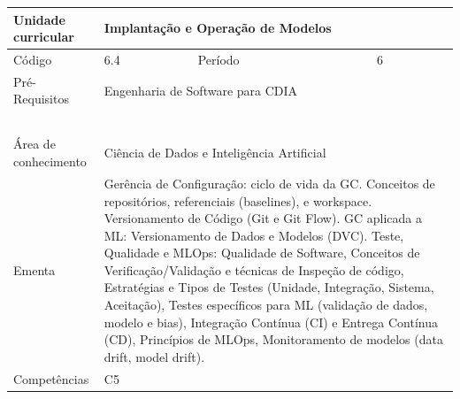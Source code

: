 \begin{quadro}[ht!]
  \centering\scriptsize
\caption{Unidade Curricular Implantação e Operação de Modelos}

\begin{tabular}{|p{2.5cm}|p{2.5cm}|p{2.5cm}|p{2.5cm}|p{2.5cm}|}\hline

  Unidade curricular & \multicolumn{4}{p{10cm}|}{ Implantação e Operação de Modelos }\\\hline
  Código & 6.4 & Período & \multicolumn{2}{p{5cm}|}{ 6 }\\\hline
  Pré-Requisitos & \multicolumn{4}{p{10cm}|}{ Engenharia de Software para CDIA } \\\hline
  \cellcolor{blue1}{ CH PRESENCIAL } &
    \cellcolor{blue1}{CH EAD Síncrona} &
    \cellcolor{blue1}{CH EAD Síncrona Mediada} &
    \cellcolor{blue1}{CH EAD Assíncrona} &
    \cellcolor{blue1}{CH APCC} \\\hline
  \cellcolor{blue1}{ 60 } &
    \cellcolor{blue1}{ 0 } &
    \cellcolor{blue1}{ 0 } &
    \cellcolor{blue1}{ 0 } &
    \cellcolor{blue1}{0} \\\hline
  \cellcolor{blue1}{ CH Teórica } &
    \cellcolor{blue1}{CH Prática} &
    \cellcolor{blue1}{CH Humanidades} &
    \cellcolor{blue1}{CH Extensão} &
    \cellcolor{blue1}{CH EAD TOTAL} \\\hline
  \cellcolor{blue1}{ 30 } &
    \cellcolor{blue1}{ 30 } &
    \cellcolor{blue1}{ 0 } &
    \cellcolor{blue1}{ 0 } &
    \cellcolor{blue1}{ 0 } \\\hline
  \cellcolor{blue1}{CARGA-HORÁRIA TOTAL} & \multicolumn{4}{p{10cm}|}{ \cellcolor{blue1}{ 60 } } \\\hline
  Área de conhecimento & \multicolumn{4}{p{10cm}|}{ Ciência de Dados e Inteligência Artificial } \\\hline
  Ementa & \multicolumn{4}{p{10cm}|}{ Gerência de Configuração: ciclo de vida da GC. Conceitos de repositórios, referenciais (baselines), e workspace. Versionamento de Código (Git e Git Flow). GC aplicada a ML: Versionamento de Dados e Modelos (DVC). Teste, Qualidade e MLOps: Qualidade de Software, Conceitos de Verificação/Validação e técnicas de Inspeção de código, Estratégias e Tipos de Testes (Unidade, Integração, Sistema, Aceitação), Testes específicos para ML (validação de dados, modelo e bias), Integração Contínua (CI) e Entrega Contínua (CD), Princípios de MLOps, Monitoramento de modelos (data drift, model drift). } \\\hline
  Competências & \multicolumn{4}{p{10cm}|}{ C5 } \\\hline


  
	\end{tabular}

\end{quadro}


